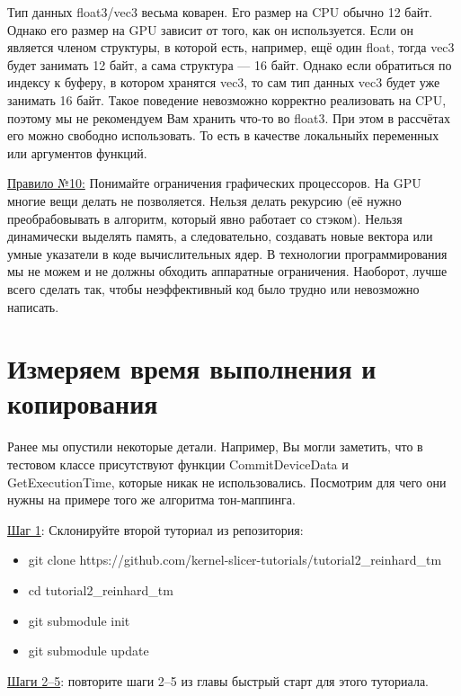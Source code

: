 \documentclass[11pt,fleqn,english,russian]{report} %
\begin{document}
\begin{remark}
Тип данных float3/vec3 весьма коварен. Его размер на CPU обычно 12 байт. Однако его размер на GPU зависит от того, как он используется. Если он является членом структуры, в которой есть, например, ещё один float, тогда vec3 будет занимать 12 байт, а сама структура --- 16 байт. Однако если обратиться по индексу к буферу, в котором хранятся vec3, то сам тип данных vec3 будет уже занимать 16 байт. Такое поведение невозможно корректно реализовать на CPU, поэтому мы не рекомендуем Вам хранить что-то во float3. При этом в рассчётах его можно свободно использовать. То есть в качестве локальныйх переменных или аргументов функций.
\end{remark}	

\underline{Правило №10:} Понимайте ограничения графических процессоров. На GPU многие вещи делать не позволяется. Нельзя делать рекурсию (её нужно преобрабовывать в алгоритм, который явно работает со стэком). Нельзя динамически выделять память, а следовательно, создавать новые вектора или умные указатели в коде вычислительных ядер. В технологии программирования мы не можем и не должны обходить аппаратные ограничения. Наоборот, лучше всего сделать так, чтобы неэффективный код было трудно или невозможно написать.

\section{Измеряем время выполнения и копирования}

Ранее мы опустили некоторые детали. Например, Вы могли заметить, что в тестовом классе присутствуют функции CommitDeviceData и GetExecutionTime, которые никак не использовались. Посмотрим для чего они нужны на примере того же алгоритма тон-маппинга.

\noindent\underline{Шаг 1}: Склонируйте второй туториал из репозитория:

\begin{itemize}
	\item git clone https://github.com/kernel-slicer-tutorials/tutorial2\_reinhard\_tm
	\item cd tutorial2\_reinhard\_tm
	\item git submodule init
	\item git submodule update
\end{itemize}

\vspace*{5px}
\noindent\underline{Шаги 2--5}: повторите шаги 2--5 из главы быстрый старт для этого туториала. 
\end{document}
